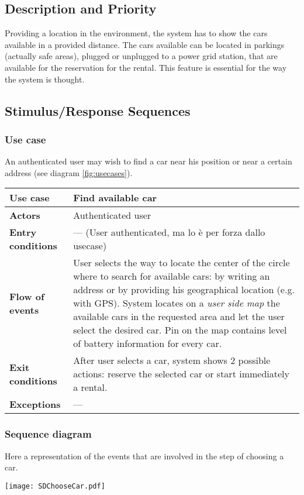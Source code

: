 \documentclass{scrreprt}
\begin{document}
\subsection{Description and Priority}
Providing a location in the environment, the system has to show the cars available in a provided distance. The cars available can be located in parkings (actually safe areas), plugged or unplugged to a power grid station, that are available for the reservation for the rental.
This feature is essential for the way the system is thought.
\subsection{Stimulus/Response Sequences}
\subsubsection{Use case}
An authenticated user may wish to find a car near his position or near a certain address (see diagram \vref{fig:usecases}).

\begin{center}
\begin{tabularx}{\columnwidth}{>{\bfseries}lX}
\toprule
Use case & Find available car\\
\midrule
Actors & Authenticated user\\
\midrule
Entry conditions & --- (User authenticated, ma lo è per forza dallo usecase)\\
\midrule
Flow of events & User selects the way to locate the center of the circle where to search for available cars: by writing an address or by providing his geographical location (e.g. with GPS). System locates on a \emph{user side map} the available cars in the requested area and let the user select the desired car. Pin on the map contains level of battery information for every car.\\
\midrule
Exit conditions & After user selects a car, system shows 2 possible actions: reserve the selected car or start immediately  a rental.\\
\midrule
Exceptions & ---\\
\bottomrule
\end{tabularx}
\end{center}

\subsubsection{Sequence diagram}
Here a representation of the events that are involved in the step of choosing a car.
\begin{center}
\texttt{[image: SDChooseCar.pdf]}
\end{center}
\end{document}
